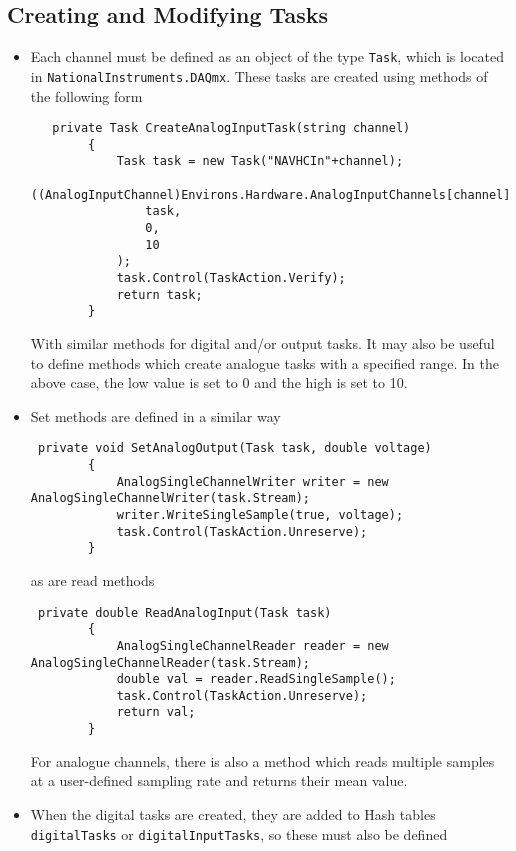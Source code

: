 \documentclass{article}
\begin{document}
\subsection{Creating and Modifying Tasks}
\begin{itemize}
\item Each channel must be defined as an object of the type \lstinline|Task|, which is located in \lstinline|NationalInstruments.DAQmx|. These tasks are created using methods of the following form
\begin{lstlisting}
   private Task CreateAnalogInputTask(string channel)
        {
            Task task = new Task("NAVHCIn"+channel);
            ((AnalogInputChannel)Environs.Hardware.AnalogInputChannels[channel]).AddToTask(
                task,
                0,
                10
            );
            task.Control(TaskAction.Verify);
            return task;
        }

\end{lstlisting}
With similar methods for digital and/or output tasks. It may also be useful to define methods which create analogue tasks with a specified range. In the above case, the low value is set to 0 and the high is set to 10.
\item Set methods are defined in a similar way
\begin{lstlisting}
 private void SetAnalogOutput(Task task, double voltage)
        {
            AnalogSingleChannelWriter writer = new AnalogSingleChannelWriter(task.Stream);
            writer.WriteSingleSample(true, voltage);
            task.Control(TaskAction.Unreserve);
        }
\end{lstlisting}
as are read methods
\begin{lstlisting}
 private double ReadAnalogInput(Task task)
        {
            AnalogSingleChannelReader reader = new AnalogSingleChannelReader(task.Stream);
            double val = reader.ReadSingleSample();
            task.Control(TaskAction.Unreserve);
            return val;
        }
\end{lstlisting}
For analogue channels, there is also a method which reads multiple samples at a user-defined sampling rate and returns their mean value.
\item When the digital tasks are created, they are added to Hash tables \lstinline|digitalTasks| or \lstinline|digitalInputTasks|, so these must also be defined
\end{itemize}
\end{document}
